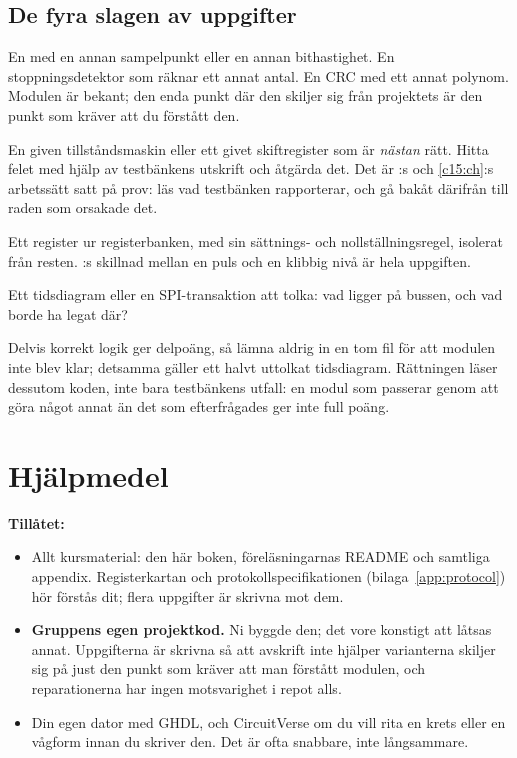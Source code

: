 \subsection*{De fyra slagen av uppgifter}
\begin{description}[style=unboxed,leftmargin=0pt,itemsep=0.8ex]
  \item[Varianter.] En  med en annan sampelpunkt eller en annan bithastighet. En
    stoppningsdetektor som räknar ett annat antal. En CRC med ett annat polynom. Modulen är
    bekant; den enda punkt där den skiljer sig från projektets är den punkt som kräver att du
    förstått den.
  \item[Reparationer.] En given tillståndsmaskin eller ett givet skiftregister som är
    \emph{nästan} rätt. Hitta felet med hjälp av testbänkens utskrift och åtgärda det. Det är
    :s och \ref{c15:ch}:s arbetssätt satt på prov: läs vad testbänken rapporterar,
    och gå bakåt därifrån till raden som orsakade det.
  \item[Ett enskilt register.] Ett register ur registerbanken, med sin sättnings- och
    nollställningsregel, isolerat från resten. :s skillnad mellan en puls och en
    klibbig nivå är hela uppgiften.
  \item[Läsning.] Ett tidsdiagram eller en SPI-transaktion att tolka: vad ligger på bussen, och vad
    borde ha legat där?
\end{description}

Delvis korrekt logik ger delpoäng, så lämna aldrig in en tom fil för att modulen inte blev klar;
detsamma gäller ett halvt uttolkat tidsdiagram. Rättningen läser dessutom koden, inte bara
testbänkens utfall: en modul som passerar genom att göra något annat än det som efterfrågades ger
inte full poäng.

\section{Hjälpmedel}
\label{c20:sec:aids}

\textbf{Tillåtet:}
\begin{itemize}
  \item Allt kursmaterial: den här boken, föreläsningarnas README och samtliga appendix.
    Registerkartan och protokollspecifikationen (bilaga~\ref{app:protocol}) hör förstås dit; flera
    uppgifter är skrivna mot dem.
  \item \textbf{Gruppens egen projektkod.} Ni byggde den; det vore konstigt att låtsas annat.
    Uppgifterna är skrivna så att avskrift inte hjälper \textemdash{} varianterna skiljer sig på
    just den punkt som kräver att man förstått modulen, och reparationerna har ingen motsvarighet i
    repot alls.
  \item Din egen dator med GHDL, och CircuitVerse om du vill rita en krets eller en vågform innan du
    skriver den. Det är ofta snabbare, inte långsammare.
\end{itemize}

